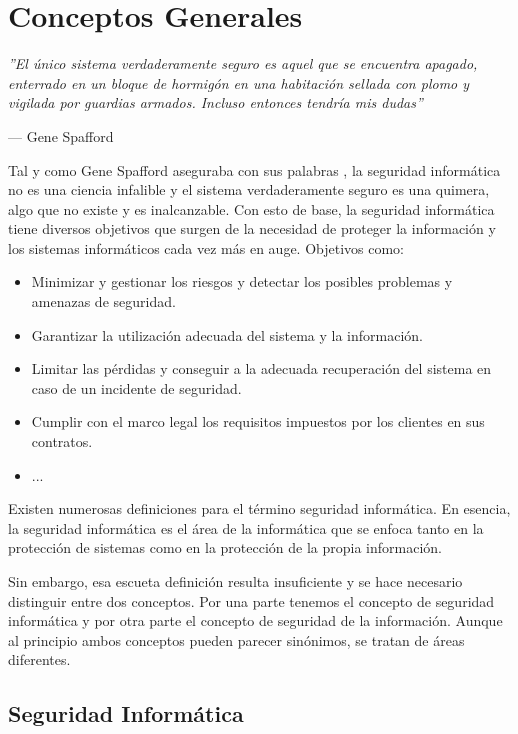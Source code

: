 \chapter{Conceptos Generales}

\epigraph{\textit{''El único sistema verdaderamente seguro es aquel que se encuentra apagado, enterrado en un bloque de hormigón en una habitación sellada con plomo y vigilada por guardias armados. Incluso entonces tendría mis dudas''}}{--- Gene Spafford}

Tal y como Gene Spafford aseguraba con sus palabras \cite{gene-spafford}, la seguridad informática no es una ciencia infalible y el sistema verdaderamente seguro es una quimera, algo que no existe y es inalcanzable. Con esto de base, la seguridad informática tiene diversos objetivos que surgen de la necesidad de proteger la información y los sistemas informáticos cada vez más en auge. Objetivos como:
\begin{itemize}
	\item Minimizar y gestionar los riesgos y detectar los posibles problemas y amenazas de seguridad.
	\item Garantizar la utilización adecuada del sistema y la información.
	\item Limitar las pérdidas y conseguir a la adecuada recuperación del sistema en caso de un incidente de seguridad.
	\item Cumplir con el marco legal los requisitos impuestos por los clientes en sus contratos.
	\item ...
	
\end{itemize}

Existen numerosas definiciones para el término seguridad informática. En esencia, la seguridad informática es el área de la informática que se enfoca tanto en la protección de sistemas como en la protección de la propia información. 

Sin embargo, esa escueta definición resulta insuficiente y se hace necesario distinguir entre dos conceptos. Por una parte tenemos el concepto de seguridad informática y por otra parte el concepto de seguridad de la información. Aunque al principio ambos conceptos pueden parecer sinónimos, se tratan de áreas diferentes.


\section{Seguridad Informática}

